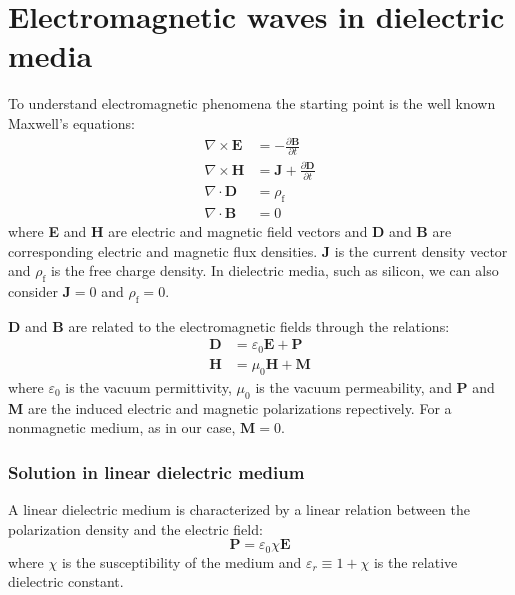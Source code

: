 \documentclass[12pt,a4paper,twoside]{article}
\begin{document}
\section{Electromagnetic waves in dielectric media}

To understand electromagnetic phenomena the starting point is the well known Maxwell's equations:
\begin{subequations}
\begin{align}
	\nabla \times \textbf{E} &= -\frac{\partial \textbf{B}}{\partial t}
		\label{eq_maxwell_a} \\
	\nabla \times \textbf{H} &= \textbf{J} + \frac{\partial \textbf{D}}{\partial t}
		\label{eq_maxwell_b} \\
	\nabla \cdot \textbf{D} &= \rho_{\mathrm{f}} 
		\label{eq_maxwell_c} \\
	\nabla \cdot \textbf{B} &= 0
		\label{eq_maxwell_d}
\end{align}
\end{subequations}
where \textbf{E} and \textbf{H} are electric and magnetic field vectors and \textbf{D} and \textbf{B} are corresponding electric and magnetic flux densities. \textbf{J} is the current density vector and $\rho_{\mathrm{f}}$ is the free charge density.
In dielectric media, such as silicon, we can also consider $\textbf{J} = 0$ and $\rho_\mathrm{f} = 0$.

\textbf{D} and \textbf{B} are related to the electromagnetic fields through the relations:
\begin{subequations}
\begin{align}
	\textbf{D} &= \varepsilon_0 \textbf{E} + \textbf{P} \\
	\textbf{H} &= \mu_0 \textbf{H} + \textbf{M}	
\end{align}
\end{subequations}
where $\varepsilon_0$ is the vacuum permittivity, $\mu_0$ is the vacuum permeability, and \textbf{P} and \textbf{M} are the induced electric and magnetic polarizations repectively.
For a nonmagnetic medium, as in our case, $\textbf{M} = 0$.

\subsubsection*{Solution in linear dielectric medium}
A linear dielectric medium is characterized by a linear relation between the polarization density and the electric field:
\begin{equation}
	\textbf{P} = \varepsilon_0 \chi \textbf{E}
	\label{eq_P_L}
\end{equation}
where $\chi$ is the susceptibility of the medium and $\varepsilon_r \equiv 1+\chi$ is the relative dielectric constant.
\end{document}
